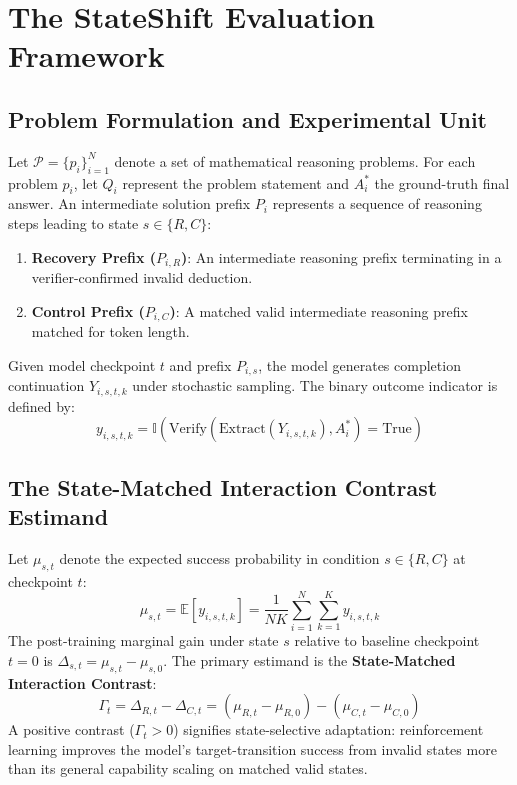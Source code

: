 \documentclass{article}
\begin{document}
\section{The StateShift Evaluation Framework}

\subsection{Problem Formulation and Experimental Unit}
Let $\mathcal{P} = \{p_i\}_{i=1}^N$ denote a set of mathematical reasoning problems. For each problem $p_i$, let $Q_i$ represent the problem statement and $A_i^*$ the ground-truth final answer. An intermediate solution prefix $P_i$ represents a sequence of reasoning steps leading to state $s \in \{R, C\}$:
\begin{enumerate}
    \item \textbf{Recovery Prefix ($P_{i,R}$)}: An intermediate reasoning prefix terminating in a verifier-confirmed invalid deduction.
    \item \textbf{Control Prefix ($P_{i,C}$)}: A matched valid intermediate reasoning prefix matched for token length.
\end{enumerate}

Given model checkpoint $t$ and prefix $P_{i,s}$, the model generates completion continuation $Y_{i,s,t,k}$ under stochastic sampling. The binary outcome indicator is defined by:
\begin{equation}
y_{i,s,t,k} = \mathbb{I}\left(\text{Verify}\left(\text{Extract}(Y_{i,s,t,k}), A_i^*\right) = \text{True}\right)
\end{equation}

\subsection{The State-Matched Interaction Contrast Estimand}
Let $\mu_{s,t}$ denote the expected success probability in condition $s \in \{R, C\}$ at checkpoint $t$:
\begin{equation}
\mu_{s,t} = \mathbb{E}[y_{i,s,t,k}] = \frac{1}{N K} \sum_{i=1}^N \sum_{k=1}^K y_{i,s,t,k}
\end{equation}
The post-training marginal gain under state $s$ relative to baseline checkpoint $t=0$ is $\Delta_{s,t} = \mu_{s,t} - \mu_{s,0}$. The primary estimand is the \textbf{State-Matched Interaction Contrast}:
\begin{equation}
\Gamma_t = \Delta_{R,t} - \Delta_{C,t} = (\mu_{R,t} - \mu_{R,0}) - (\mu_{C,t} - \mu_{C,0})
\end{equation}
A positive contrast ($\Gamma_t > 0$) signifies state-selective adaptation: reinforcement learning improves the model's target-transition success from invalid states more than its general capability scaling on matched valid states.
\end{document}
